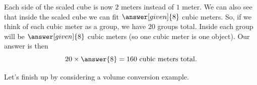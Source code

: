 \documentclass{ximera}
\begin{document}
\begin{example}
\begin{image}
\end{image}

Each side of the scaled cube is now $2$ meters instead of $1$ meter. We can also see that inside the scaled cube we can fit $\answer[given]{8}$ cubic meters. So, if we think of each cubic meter as a group, we have $20$ groups total. Inside each group will be $\answer[given]{8}$ cubic meters (so one cubic meter is one object). Our answer is then
\[
20 \times \answer{8} = {160} \textrm{ cubic meters total.}
\]
\end{example}

Let's finish up by considering a volume conversion example.
\end{document}
